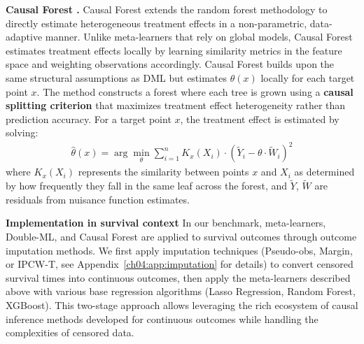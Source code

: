 \textbf{Causal Forest \citep{athey2019grf}.} Causal Forest extends the random forest methodology to directly estimate heterogeneous treatment effects in a non-parametric, data-adaptive manner. Unlike meta-learners that rely on global models, Causal Forest estimates treatment effects locally by learning similarity metrics in the feature space and weighting observations accordingly. Causal Forest builds upon the same structural assumptions as DML but estimates $\theta(x)$ locally for each target point $x$. The method constructs a forest where each tree is grown using a \textbf{causal splitting criterion} that maximizes treatment effect heterogeneity rather than prediction accuracy. For a target point $x$, the treatment effect is estimated by solving:
\begin{align*}
    \hat{\theta}(x) = \arg\min_{\theta} \sum_{i=1}^n K_x(X_i) \cdot (\tilde{Y}_i - \theta \cdot \tilde{W}_i)^2
\end{align*}
where $K_x(X_i)$ represents the similarity between points $x$ and $X_i$ as determined by how frequently they fall in the same leaf across the forest, and $\tilde{Y}$, $\tilde{W}$ are residuals from nuisance function estimates.

\textbf{Implementation in survival context}
In our benchmark, meta-learners, Double-ML, and Causal Forest are applied to survival outcomes through outcome imputation methods.
We first apply imputation techniques (Pseudo-obs, Margin, or IPCW-T, see Appendix~\ref{ch04:app:imputation} for details) to convert censored survival times into continuous outcomes, then apply the meta-learners described above with various base regression algorithms (Lasso Regression, Random Forest, XGBoost).
This two-stage approach allows leveraging the rich ecosystem of causal inference methods developed for continuous outcomes while handling the complexities of censored data.

